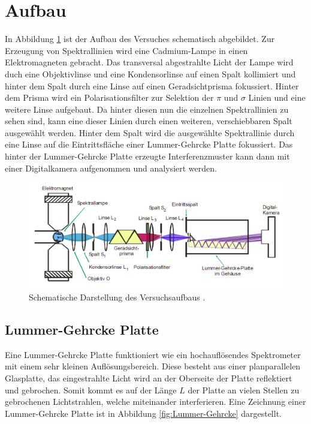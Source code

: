 \section{Aufbau}
In Abbildung \ref{fig:Aufbau} ist der Aufbau des Versuches schematisch abgebildet.
Zur Erzeugung von Spektrallinien wird eine Cadmium-Lampe in einen Elektromagneten gebracht.
Das transversal abgestrahlte Licht der Lampe wird duch eine Objektivlinse und eine Kondensorlinse auf einen Spalt kollimiert und hinter dem Spalt durch eine Linse auf einen Geradsichtprisma fokussiert.
Hinter dem Prisma wird ein Polarisationsfilter zur Selektion der $\pi$ und $\sigma$ Linien und eine weitere Linse aufgebaut.
Da hinter diesen nun die einzelnen Spektrallinien zu sehen sind, kann eine dieser Linien durch einen weiteren, verschiebbaren Spalt ausgewählt werden.
Hinter dem Spalt wird die ausgewählte Spektrallinie durch eine Linse auf die Eintrittsfläche einer Lummer-Gehrcke Platte fokussiert.
Das hinter der Lummer-Gehrcke Platte erzeugte Interferenzmuster kann dann mit einer Digitalkamera aufgenommen und analysiert werden.

\begin{figure}[H]
  \centering
  \includegraphics[width = .7\textwidth]{images/Aufbau.png}
  \caption{Schematische Darstellung des Versuchsaufbaus \cite{anleitung}.}
  \label{fig:Aufbau}
\end{figure}

\subsection{Lummer-Gehrcke Platte}

Eine Lummer-Gehrcke Platte funktioniert wie ein hochauflösendes Spektrometer mit einem sehr kleinen Auflösungsbereich.
Diese besteht aus einer planparallelen Glasplatte, das eingestrahlte Licht wird an der Oberseite der Platte reflektiert und gebrochen.
Somit kommt es auf der Länge $L$ der Platte an vielen Stellen zu gebrochenen Lichtstrahlen, welche miteinander interferieren.
Eine Zeichnung einer Lummer-Gehrcke Platte ist in Abbildung \ref{fig:Lummer-Gehrcke} dargestellt.

